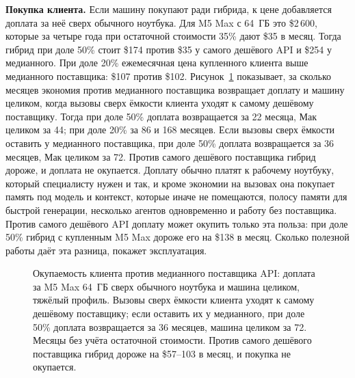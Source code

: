 \textbf{Покупка клиента.} Если машину покупают ради гибрида, к цене добавляется доплата за неё сверх обычного
ноутбука. Для M5 Max с 64~ГБ это \$2\,600, которые за четыре года при остаточной стоимости 35\% дают \$35 в месяц.
Тогда гибрид при доле 50\% стоит \$174 против \$35 у самого дешёвого API и \$254 у медианного. При доле 20\% ежемесячная цена купленного клиента выше медианного
поставщика: \$107 против \$102. Рисунок~\ref{fig:payback} показывает, за сколько
месяцев экономия против медианного поставщика возвращает доплату и машину целиком, когда вызовы сверх ёмкости
клиента уходят к самому дешёвому поставщику. Тогда при доле 50\% доплата возвращается за 22 месяца, Мак целиком за 44; при доле 20\% за 86 и 168 месяцев. Если вызовы сверх ёмкости оставить у медианного поставщика, при доле 50\%
доплата возвращается за 36 месяцев, Мак целиком за 72. Против самого дешёвого поставщика гибрид дороже,
и доплата не окупается. Доплату обычно платят к рабочему ноутбуку, который
специалисту нужен и так, и кроме экономии на вызовах она покупает память под модель и контекст, которые иначе не
помещаются, полосу памяти для быстрой генерации, несколько агентов одновременно и работу без поставщика. Против
самого дешёвого API доплату может окупить только эта польза: при доле 50\% гибрид с купленным M5 Max дороже его на \$138 в месяц. Сколько полезной работы даёт эта разница, покажет эксплуатация.

\begin{figure}[t]
\centering
{}
\caption{Окупаемость клиента против медианного поставщика API: доплата за M5 Max 64~ГБ сверх обычного ноутбука и
машина целиком, тяжёлый профиль. Вызовы сверх ёмкости клиента уходят к самому дешёвому поставщику; если оставить их
у медианного, при доле 50\% доплата возвращается за 36 месяцев, машина целиком за 72. Месяцы без учёта остаточной
стоимости. Против самого дешёвого поставщика гибрид дороже на \$57--103 в месяц, и покупка не окупается.}
\label{fig:payback}
\end{figure}

